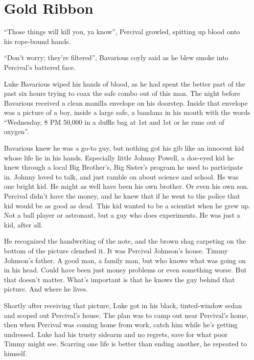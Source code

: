 \chapter{Gold Ribbon}



``Those things will kill you, ya know'', Percival
growled, spitting up blood onto his rope-bound hands.

``Don't worry; they're filtered'', Bavarious
coyly said as he blew smoke into Percival's battered
face.

Luke Bavarious wiped his hands of blood, as he had spent the better
part of the past six hours trying to coax the safe combo out of
this man. The night before Bavarious received a clean manilla
envelope on his doorstep. Inside that envelope was a picture of a
boy, inside a large safe, a bandana in his mouth with the words
``Wednesday, 8 PM 50,000 in a duffle bag at 1st and 1st or he
runs out of oxygen''.



Bavarious knew he was a go-to guy, but nothing got his gib like an
innocent kid whose life lie in his hands. Especially little Johnny
Powell, a doe-eyed kid he knew through a local Big Brother's,
Big Sister's program he used to participate in. Johnny loved
to talk, and just ramble on about science and school. He was one
bright kid. He might as well have been his own brother. Or even his
own son. Percival didn't have the money, and he knew that if
he went to the police that kid would be as good as dead. This kid
wanted to be a scientist when he grew up. Not a ball player or
astronaut, but a guy who does experiments. He was just a kid, after
all.



He recognized the handwriting of the note, and the brown shag
carpeting on the bottom of the picture clenched it. It was Percival
Johnson's house. Timmy Johnson's father. A good man, a
family man, but who knows what was going on in his head. Could have
been just money problems or even something worse. But that
doesn't matter. What's important is that he knows the
guy behind that picture. And where he lives.



Shortly after receiving that picture, Luke got in his black,
tinted-window sedan and scoped out Percival's house. The plan
was to camp out near Percival's home, then when Percival was
coming home from work, catch him while he's getting
undressed. Luke had his trusty sidearm and no regrets, save for
what poor Timmy might see. Scarring one life is better than ending
another, he repeated to himself.



